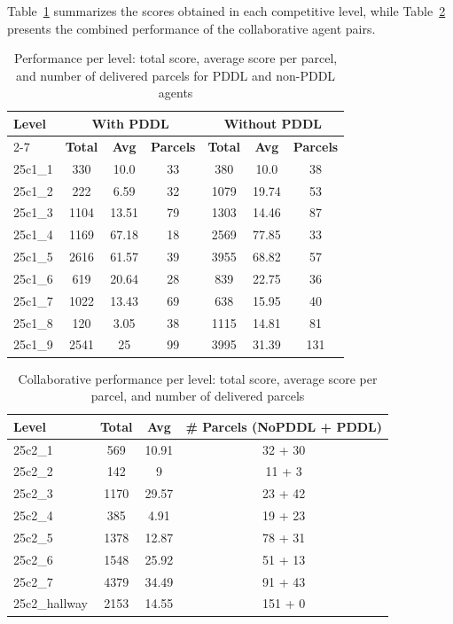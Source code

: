 Table~\ref{tab:results} summarizes the scores obtained in each competitive level, while Table~\ref{tab:collaborative-results} presents the combined performance of the collaborative agent pairs.

\begin{table}[!htbp]
	\centering
	\caption{Performance per level: total score, average score per parcel, and number of delivered parcels for PDDL and non-PDDL agents}
	\label{tab:results}
	\begin{tabular}{|l|ccc|ccc|}
		\toprule
		\textbf{Level} & \multicolumn{3}{c|}{\textbf{With PDDL}} & \multicolumn{3}{c|}{\textbf{Without PDDL}} \\
		\cmidrule{2-7}
		& \textbf{Total} & \textbf{Avg} & \textbf{Parcels} & \textbf{Total} & \textbf{Avg} & \textbf{Parcels} \\
		\midrule
		25c1\_1 & 330 & 10.0 & 33 & 380 & 10.0 & 38 \\
		25c1\_2 & 222 & 6.59 & 32 & 1079 & 19.74 & 53 \\
		25c1\_3 & 1104 & 13.51 & 79 & 1303 & 14.46 & 87 \\
		25c1\_4 & 1169 & 67.18 & 18 & 2569 & 77.85 & 33 \\
		25c1\_5 & 2616 & 61.57 & 39 & 3955 & 68.82 & 57 \\
		25c1\_6 & 619 & 20.64 & 28 & 839 & 22.75 & 36 \\
		25c1\_7 & 1022 & 13.43 & 69 & 638 & 15.95 & 40 \\
		25c1\_8 &  120 &  3.05 & 38 & 1115 & 14.81 & 81 \\
		25c1\_9 & 2541 &  25 & 99 & 3995 & 31.39 & 131 \\
		\midrule
	\end{tabular}
\end{table}

\clearpage

\begin{table}[!htbp]
	\centering
	\caption{Collaborative performance per level: total score, average score per parcel, and number of delivered parcels}
	\label{tab:collaborative-results}
	\begin{tabular}{|l|ccc|}
		\toprule
		\textbf{Level} & \textbf{Total} & \textbf{Avg} & \textbf{\# Parcels (NoPDDL + PDDL)} \\
		\midrule
		25c2\_1 & 569  & 10.91 & 32 + 30 \\
		25c2\_2 & 142  & 9     & 11 + 3  \\
		25c2\_3 & 1170 & 29.57 & 23 + 42 \\
		25c2\_4 & 385  & 4.91  & 19 + 23 \\
		25c2\_5 & 1378 & 12.87 & 78 + 31 \\
		25c2\_6 & 1548 & 25.92 & 51 + 13 \\
		25c2\_7 & 4379 & 34.49 & 91 + 43 \\
		25c2\_hallway & 2153 & 14.55 & 151 + 0 \\
		\midrule
	\end{tabular}
\end{table}

